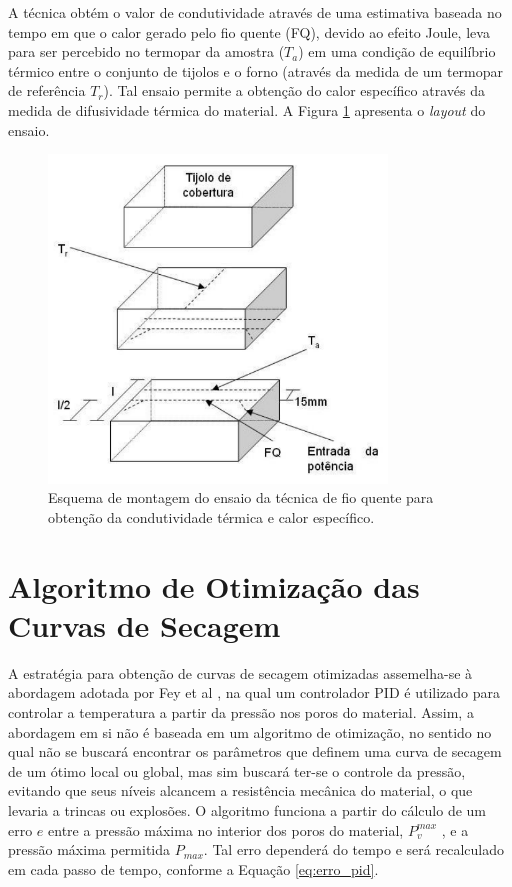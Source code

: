A técnica obtém o valor de condutividade através de uma estimativa baseada no
tempo em que o calor gerado pelo fio quente (FQ), devido ao efeito Joule, leva
para ser percebido no termopar da amostra ($T_a$) em uma condição de equilíbrio
térmico entre o conjunto de tijolos e o forno (através da medida de um termopar
de referência $T_r$). Tal ensaio permite a obtenção do calor específico através
da medida de difusividade térmica do material. A Figura \ref{fig:fio_quente}
apresenta o {\it layout} do ensaio.

\begin{figure}[!ht]
	\centering
	\includegraphics[width=9cm]{./figures/fio_quente.pdf}
	\caption{Esquema de montagem do ensaio da técnica de fio quente para obtenção
    da condutividade térmica e calor específico. \label{fig:fio_quente}}
\end{figure}

\section{Algoritmo de Otimização das Curvas de Secagem}\label{mat:pid}
A estratégia para obtenção de curvas de secagem otimizadas assemelha-se à
abordagem adotada por Fey et al \cite{Fey2017c}, na qual um controlador PID é
utilizado para controlar a temperatura a partir da pressão nos poros do
material. Assim, a abordagem em si não é baseada em um algoritmo de otimização,
no sentido no qual não se buscará encontrar os parâmetros que definem uma curva
de secagem de um ótimo local ou global, mas sim buscará ter-se o controle da
pressão, evitando que seus níveis alcancem a resistência mecânica do material, o
que levaria a trincas ou explosões. O algoritmo funciona a partir do cálculo de
um erro $e$ entre a pressão máxima no interior dos poros do material,
$P_v^{max}$ , e a pressão máxima permitida $P_{max}$. Tal erro dependerá do
tempo e será recalculado em cada passo de tempo, conforme a Equação
\ref{eq:erro_pid}.

